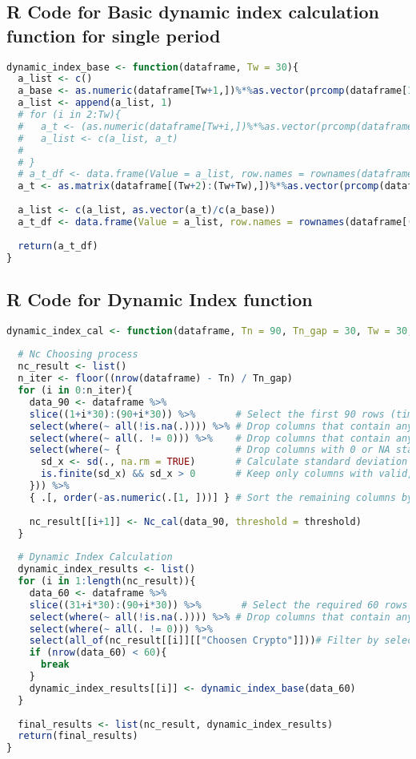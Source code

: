 \documentclass[12pt]{article}
\begin{document}
\subsection*{R Code for Basic dynamic index calculation function for single period}
\begin{lstlisting}[language=R, caption={DI_base}]
dynamic_index_base <- function(dataframe, Tw = 30){
  a_list <- c()
  a_base <- as.numeric(dataframe[Tw+1,])%*%as.vector(prcomp(dataframe[1:Tw,], scale.= TRUE)$rotation[,1])
  a_list <- append(a_list, 1)
  # for (i in 2:Tw){
  #   a_t <- (as.numeric(dataframe[Tw+i,])%*%as.vector(prcomp(dataframe[i:(Tw+i-1),], scale.= TRUE)$rotation[,1]))/a_base
  #   a_list <- c(a_list, a_t)
  #   
  # }
  # a_t_df <- data.frame(Value = a_list, row.names = rownames(dataframe[(Tw+1):(Tw+Tw),]))
  a_t <- as.matrix(dataframe[(Tw+2):(Tw+Tw),])%*%as.vector(prcomp(dataframe[1:Tw,], scale.= TRUE)$rotation[,1])
  
  a_list <- c(a_list, as.vector(a_t)/c(a_base))
  a_t_df <- data.frame(Value = a_list, row.names = rownames(dataframe[(Tw+1):(Tw+Tw),]))
  
  return(a_t_df)
}
\end{lstlisting}

\subsection*{R Code for Dynamic Index function}
\begin{lstlisting}[language=R, caption={DI_{base}}]
dynamic_index_cal <- function(dataframe, Tn = 90, Tn_gap = 30, Tw = 30, threshold = 0.99){
  
  # Nc Choosing process
  nc_result <- list()
  n_iter <- floor((nrow(dataframe) - Tn) / Tn_gap)
  for (i in 0:n_iter){
    data_90 <- dataframe %>%
    slice((1+i*30):(90+i*30)) %>%       # Select the first 90 rows (time window)
    select(where(~ all(!is.na(.)))) %>% # Drop columns that contain any NA values
    select(where(~ all(. != 0))) %>%    # Drop columns that contain any 0 values
    select(where(~ {                    # Drop columns with 0 or NA standard deviation
      sd_x <- sd(., na.rm = TRUE)       # Calculate standard deviation ignoring NA
      is.finite(sd_x) && sd_x > 0       # Keep only columns with valid, non-zero SD
    })) %>%
    { .[, order(-as.numeric(.[1, ]))] } # Sort the remaining columns by the first row, descending
    
    nc_result[[i+1]] <- Nc_cal(data_90, threshold = threshold)
  }
  
  # Dynamic Index Calculation
  dynamic_index_results <- list()
  for (i in 1:length(nc_result)){
    data_60 <- dataframe %>%
    slice((31+i*30):(90+i*30)) %>%       # Select the required 60 rows (time window)
    select(where(~ all(!is.na(.)))) %>% # Drop columns that contain any NA values
    select(where(~ all(. != 0))) %>%
    select(all_of(nc_result[[i]][["Choosen Crypto"]]))# Filter by selected crypto
    if (nrow(data_60) < 60){
      break
    }
    dynamic_index_results[[i]] <- dynamic_index_base(data_60)
  }
  
  final_results <- list(nc_result, dynamic_index_results)
  return(final_results)
}
\end{lstlisting}
\end{document}
